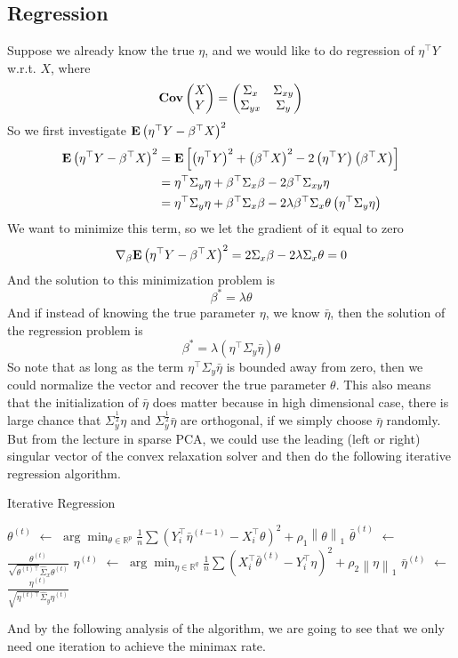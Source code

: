 \documentclass[12pt]{article}
\newcommand{\E}{{\bf E}}
\newcommand{\Cov}{{\bf Cov}}
\newcommand{\lam}{\lambda}
\newcommand{\R}{\mathbb R}
\newcommand{\tp}{^\top}
\newcommand{\Y}{{\boldsymbol Y}}
\newcommand{\bra}[1]{\left(#1\right)}
\newcommand{\norm}[1]{\left\|#1\right\|}
\newcommand{\wh}[1]{\widehat{#1}}
\newcommand{\srt}{^{\frac{1}{2}}}
\def\beq{\begin{equation}}
\def\eeq{\end{equation}}
\def\beqal{\begin{equation}\begin{aligned}}
\def\eeqal{\end{aligned}\end{equation}}
\newcommand{\ndone}{\frac{1}{n}}
\newcommand*\Let[2]{\State #1 $\gets$ #2}
\begin{document}
\subsection{Regression}
Suppose we already know the true $\eta$, and we would like to do regression of $\eta\tp Y$ w.r.t. $X$, where
\beq
\Cov\begin{pmatrix}
X\\Y
\end{pmatrix}=
\begin{pmatrix}
\Sigma_{x}&\Sigma_{xy}\\
\Sigma_{yx}&\Sigma_{y}\\
\end{pmatrix}
\eeq
So we first investigate $\E \bra{\eta\tp Y-\beta\tp X}^2$
\beqal
\E \bra{\eta\tp Y-\beta\tp X}^2&=\E\left[ \bra{\eta\tp Y}^2 +\bra{\beta\tp X}^2 - 2\bra{\eta\tp Y}\bra{\beta\tp X} \right]\\
&=\eta\tp\Sigma_{y}\eta+\beta\tp\Sigma_{x}\beta-2\beta\tp \Sigma_{xy}\eta\\
&=\eta\tp\Sigma_{y}\eta+\beta\tp\Sigma_{x}\beta-2\lam \beta\tp \Sigma_{x}\theta\bra{\eta\tp \Sigma_{y}\eta}\\
\eeqal
We want to minimize this term, so we let the gradient of it equal to zero
\beq
\nabla_{\beta}\E \bra{\eta\tp Y-\beta\tp X}^2=2\Sigma_{x}\beta-2\lam\Sigma_{x}\theta=0
\eeq
And the solution to this minimization problem is
\beq
\beta^*=\lam \theta
\eeq
And if instead of knowing the true parameter $\eta$, we know $\bar{\eta}$, then the solution of the regression problem is
\beq\label{eq:regression}
\beta^*=\lam\bra{\eta\tp\Sigma_{y}\bar{\eta}}\theta
\eeq
So note that as long as the term $\eta\tp\Sigma_{y}\bar{\eta}$ is bounded away from zero, then we could normalize the vector and recover the true parameter $\theta$. This also means that the initialization of $\bar{\eta}$ does matter because in high dimensional case, there is large chance that $\Sigma_{y}\srt \eta$ and $\Sigma_{y}\srt\bar{\eta}$ are orthogonal, if we simply choose $\bar{\eta}$ randomly. But from the lecture in sparse PCA, we could use the leading (left or right) singular vector of the convex relaxation solver and then do the following iterative regression algorithm.
\begin{algorithm}[H]
\caption{Iterative Regression}
\begin{algorithmic}[1]
\Let{$\theta^{(t)}$}{$\arg\min_{\theta\in\R^p}\ndone\sum\bra{Y_i\tp\bar{\eta}^{(t-1)}-X_i\tp\theta}^2+\rho_1\norm{\theta}_1$}
\Let{$\bar{\theta}^{(t)}$}{$\frac{\theta^{(t)}}{\sqrt{\theta^{(t)\top}} \wh{\Sigma}_x\theta^{(t)}}$}
\Let{$\eta^{(t)}$}{$\arg\min_{\eta\in\R^q}\ndone\sum\bra{X_i\tp\bar{\theta}^{(t)}- Y_i\tp{\eta}}^2+\rho_2\norm{\eta}_1$}
\Let{$\bar{\eta}^{(t)}$}{$\frac{\eta^{(t)}}{\sqrt{\eta^{(t)\top}} \wh{\Sigma}_y\eta^{(t)}}$}
\EndFor
\State {}
\EndFunction
\end{algorithmic}
\end{algorithm}
And by the following analysis of the algorithm, we are going to see that we only need one iteration to achieve the minimax rate.
\end{document}
